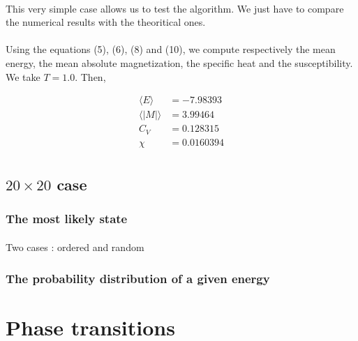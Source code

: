 \documentclass[a4paper, twoside, 11pt]{report}
\theoremstyle{theorem}
\theoremstyle{remark}
\theoremstyle{exemple}
\begin{document}
            \paragraph{}This very simple case allows us to test the algorithm. We just have to compare the numerical results with the theoritical ones.
            
            \paragraph{}Using the equations (5), (6), (8) and (10), we compute respectively the mean energy, the mean absolute magnetization, the specific heat and the susceptibility. We take $T=1.0$.
            Then,
                
                \begin{align*}
                    \langle E \rangle &= -7.98393 \tag{12}\\
                    \langle |M| \rangle &= 3.99464 \tag{13}\\
                    C_V &= 0.128315 \tag{14}\\
                    \chi &= 0.0160394 \tag{15}\\
                \end{align*}
            
            
        \subsection{$20\times20$ case}
        
            \subsubsection{The most likely state}
            
                \paragraph{}Two cases : ordered and random
            
            \subsubsection{The probability distribution of a given energy}
    
    \section{Phase transitions}
    
\end{document}
